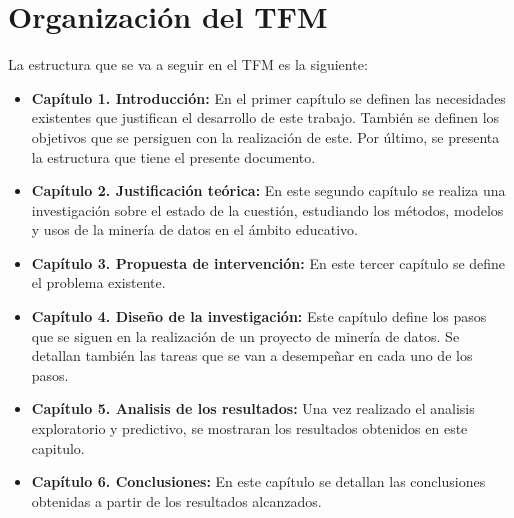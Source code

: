 \section{Organización del TFM}
La estructura que se va a seguir en el TFM es la siguiente:
\begin{itemize}
	\item \textbf{Capítulo 1. Introducción:} En el primer capítulo se definen las necesidades existentes que justifican el desarrollo de este trabajo. También se definen los objetivos que se persiguen con la realización de este. Por último, se presenta la estructura que tiene el presente documento.
	\item \textbf{Capítulo 2. Justificación teórica:} En este segundo capítulo se realiza una investigación sobre el estado de la cuestión, estudiando los métodos, modelos y usos de la minería de datos en el ámbito educativo. 
	\item \textbf{Capítulo 3. Propuesta de intervención:} En este tercer capítulo se define el problema existente.
	\item \textbf{Capítulo 4. Diseño de la investigación:} Este capítulo define los pasos que se siguen en la realización de un proyecto de minería de datos. Se detallan también las tareas que se van a desempeñar en cada uno de los pasos.
	\item \textbf{Capítulo 5. Analisis de los resultados:} Una vez realizado el analisis exploratorio y predictivo, se mostraran los resultados obtenidos en este capitulo.
	\item \textbf{Capítulo 6. Conclusiones:} En este capítulo se detallan las conclusiones obtenidas a partir de los resultados alcanzados.
\end{itemize}




